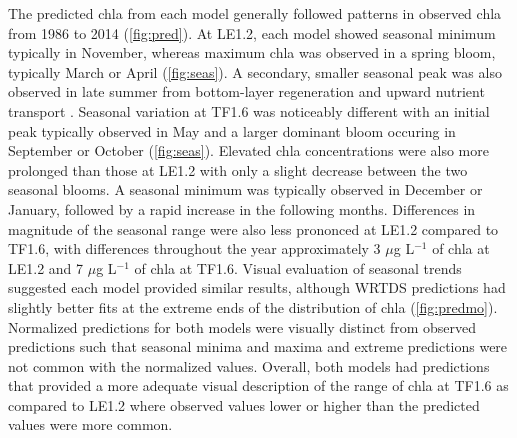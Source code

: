 \documentclass[letterpaper,12pt,oneside]{article}\usepackage[]{graphicx}\usepackage[]{color}
\newcommand{\mugl}{$\mu$g L$^{-1}$ }
\begin{document}
The predicted \ac{chla} from each model generally followed patterns in observed \ac{chla} from 1986 to 2014 (\cref{fig:pred}).  At LE1.2, each model showed seasonal minimum typically in November, whereas maximum \ac{chla} was observed in a spring bloom, typically March or April (\cref{fig:seas}).  A secondary, smaller seasonal peak was also observed in late summer from bottom-layer regeneration and upward nutrient transport \citep{Testa08a}.  Seasonal variation at TF1.6 was noticeably different with an initial peak typically observed in May and a larger dominant bloom occuring in September or October (\cref{fig:seas}).  Elevated \ac{chla}  concentrations were also more prolonged than those at LE1.2 with only a slight decrease between the two seasonal blooms.  A seasonal minimum was typically observed in December or January, followed by a rapid increase in the following months.  Differences in magnitude of the seasonal range were also less prononced at LE1.2 compared to TF1.6, with differences throughout the year approximately 3 \mugl of \ac{chla} at LE1.2 and 7 \mugl of \ac{chla} at TF1.6. Visual evaluation of seasonal trends suggested each model provided similar results, although \ac{WRTDS} predictions had slightly better fits at the extreme ends of the distribution of \ac{chla} (\cref{fig:predmo}).  Normalized predictions for both models were visually distinct from observed predictions such that seasonal minima and maxima and extreme predictions were not common with the normalized values.  Overall, both models had predictions that provided a more adequate visual description of the range of \ac{chla} at TF1.6 as compared to LE1.2 where observed values lower or higher than the predicted values were more common.  
\end{document}
